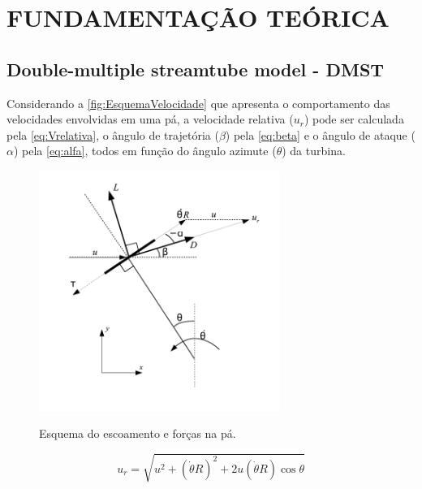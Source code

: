 
\chapter{FUNDAMENTAÇÃO TEÓRICA}
\label{chap:fundamentacao-teorica}

\section{Double-multiple streamtube model - DMST}
\label{sec:dmst}

Considerando a \autoref{fig:EsquemaVelocidade} que apresenta o comportamento das velocidades envolvidas em uma pá, a velocidade relativa ($u_r$) pode ser calculada pela \autoref{eq:Vrelativa}, o ângulo de trajetória ($\beta$) pela \autoref{eq:beta} e o ângulo de ataque ($\alpha$) pela \autoref{eq:alfa}, todos em função do ângulo azimute ($\theta$) da turbina.

\begin{figure}
	\centering
	\caption{Esquema do escoamento e forças na pá.}
	\includegraphics[width=0.7\textwidth]{figuras/EsquemaVelocidade.pdf}
	\label{fig:EsquemaVelocidade}
\end{figure}

\begin{equation}
{u_r} = \sqrt {{u^2} + {{(\dot \theta R)}^2} + 2u(\dot \theta R)\cos \theta }
\label{eq:Vrelativa}
\end{equation}

